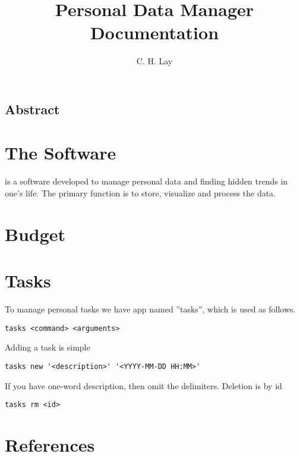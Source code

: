 \documentclass{article}
\title{Personal Data Manager\\ \Large{Documentation}}
\author{C. H. Lay}
\begin{document}
\maketitle
\tableofcontents

\subsection*{Abstract}


\section{The Software}
 is a software developed to manage personal data and finding hidden trends in one's life. The primary function is to store, visualize and process the data.

\section{Budget}

\section{Tasks}
To manage personal tasks we have app named ''tasks'', which is used as follows.
\begin{lstlisting}
tasks <command> <arguments>
\end{lstlisting}
Adding a task is simple
\begin{lstlisting}
tasks new '<description>' '<YYYY-MM-DD HH:MM>'
\end{lstlisting}
If you have one-word description, then omit the delimiters.
Deletion is by id
\begin{lstlisting}
tasks rm <id>
\end{lstlisting}
\section{References}
\end{document}
